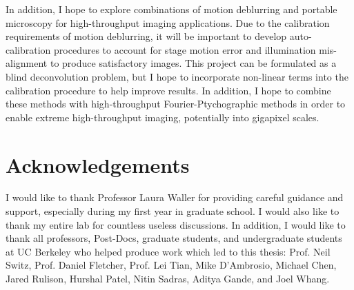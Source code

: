 In addition, I hope to explore combinations of motion deblurring and portable microscopy for high-throughput imaging applications. Due to the calibration requirements of motion deblurring, it will be important to develop auto-calibration procedures to account for stage motion error and illumination mis-alignment to produce satisfactory images. This project can be formulated as a blind deconvolution problem, but I hope to incorporate non-linear terms into the calibration procedure to help improve results. In addition, I hope to combine these methods with high-throughput Fourier-Ptychographic methods in order to enable extreme high-throughput imaging, potentially into gigapixel scales.

\section{Acknowledgements}
I would like to thank Professor Laura Waller for providing careful guidance and support, especially during my first year in graduate school. I would also like to thank my entire lab for countless useless discussions. In addition, I would like to thank all professors, Post-Docs, graduate students, and undergraduate students at UC Berkeley who helped produce work which led to this thesis: Prof. Neil Switz, Prof. Daniel Fletcher, Prof. Lei Tian, Mike D’Ambrosio, Michael Chen, Jared Rulison, Hurshal Patel, Nitin Sadras, Aditya Gande, and Joel Whang.